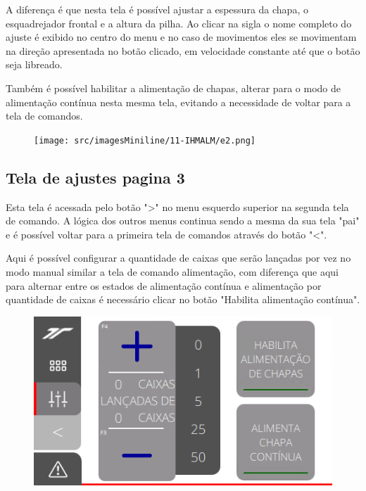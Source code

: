 A diferença é que nesta tela é possível ajustar a espessura da chapa, o esquadrejador frontal e a altura da pilha.
Ao clicar na sigla o nome completo do ajuste é exibido no centro do menu e no caso de movimentos eles se movimentam na direção apresentada no botão clicado,
em velocidade constante até que o botão seja libreado.

Também é possível habilitar a alimentação de chapas, alterar para o modo de alimentação contínua nesta mesma tela, evitando a necessidade de voltar para a tela de comandos.

\vspace*{\fill}
\begin{figure}[h]
  \centering
  \texttt{[image: src/imagesMiniline/11-IHMALM/e2.png]}
\end{figure}
\vspace*{\fill}


\newpage
\thispagestyle{fancy}
\vspace*{40 pt}
\subsection{Tela de ajustes pagina 3}\label{miniIelaAjustes3}
Esta tela é acessada pelo botão "\textgreater" no menu esquerdo superior na segunda tela de comando. A lógica dos outros menus continua sendo a mesma da sua tela "pai" e é possível voltar para a primeira tela de comandos através do botão "\textless{}".

Aqui é possível configurar a quantidade de caixas que serão lançadas por vez no modo manual similar a tela de comando alimentação, com diferença que aqui
 para alternar entre os estados de alimentação contínua e alimentação por quantidade de caixas é necessário clicar no botão "Habilita alimentação contínua".
\vspace*{\fill}
\begin{figure}[h]
  \centering
  \includegraphics{src/imagesFlexo/11-IHMALM/e-5.png}
\end{figure}
\vspace*{\fill}
